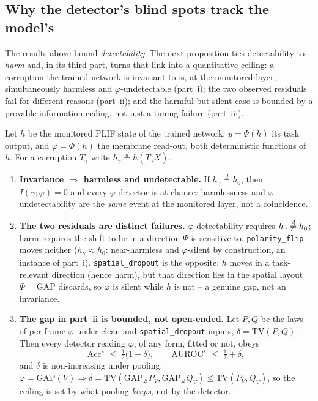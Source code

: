 ﻿\documentclass{article} %
\theoremstyle{remark}
\begin{document}
\subsection{Why the detector's blind spots track the model's}
\label{app:invariance}
The results above bound \emph{detectability}. The next proposition ties detectability to \emph{harm}
and, in its third part, turns that link into a quantitative ceiling: a corruption the trained network
is invariant to is, at the monitored layer, simultaneously harmless and $\varphi$-undetectable
(part~i); the two observed residuals fail for different reasons (part~ii); and the harmful-but-silent
case is bounded by a provable information ceiling, not just a tuning failure (part~iii).

\begin{proposition}
\label{prop:invariance}
\label{prop:tv-ceiling}
Let $h$ be the monitored PLIF state of the trained network, $y=\Psi(h)$ its task output, and
$\varphi=\Phi(h)$ the membrane read-out, both deterministic functions of $h$. For a corruption
$T_\gamma$ write $h_\gamma\overset{d}{=}h(T_\gamma X)$.
\begin{enumerate}
  \item[(i)] \textbf{Invariance $\Rightarrow$ harmless and undetectable.} If
  $h_\gamma\overset{d}{=}h_0$, then $I(\gamma;\varphi)=0$ and every $\varphi$-detector is at chance:
  harmlessness and $\varphi$-undetectability are the \emph{same} event at the monitored layer, not a
  coincidence.
  \item[(ii)] \textbf{The two residuals are distinct failures.} $\varphi$-detectability requires
  $h_\gamma\not\overset{d}{=}h_0$; harm requires the shift to lie in a direction $\Psi$ is sensitive
  to. \texttt{polarity\_flip} moves neither ($h_\gamma\approx h_0$: near-harmless and $\varphi$-silent
  by construction, an instance of part~i). \texttt{spatial\_dropout} is the opposite: $h$ moves in a
  task-relevant direction (hence harm), but that direction lies in the spatial layout
  $\Phi=\mathrm{GAP}$ discards, so $\varphi$ is silent while $h$ is not -- a genuine gap, not an
  invariance.
  \item[(iii)] \textbf{The gap in part~ii is bounded, not open-ended.} Let $P,Q$ be the laws of
  per-frame $\varphi$ under clean and \texttt{spatial\_dropout} inputs, $\delta=\mathrm{TV}(P,Q)$.
  Then every detector reading $\varphi$, of any form, fitted or not, obeys
  \begin{equation}
    \mathrm{Acc}^\star \;\le\; \tfrac12\bigl(1+\delta\bigr), \qquad
    \mathrm{AUROC}^\star \;\le\; \tfrac12+\delta,
    \label{eq:tv-ceiling}
  \end{equation}
  and $\delta$ is non-increasing under pooling:
  $\varphi=\mathrm{GAP}(V)\Rightarrow\delta=\mathrm{TV}(\mathrm{GAP}_\#P_V,\mathrm{GAP}_\#Q_V)
  \le\mathrm{TV}(P_V,Q_V)$, so the ceiling is set by what pooling \emph{keeps}, not by the detector.
\end{enumerate}
\end{proposition}
\end{document}
